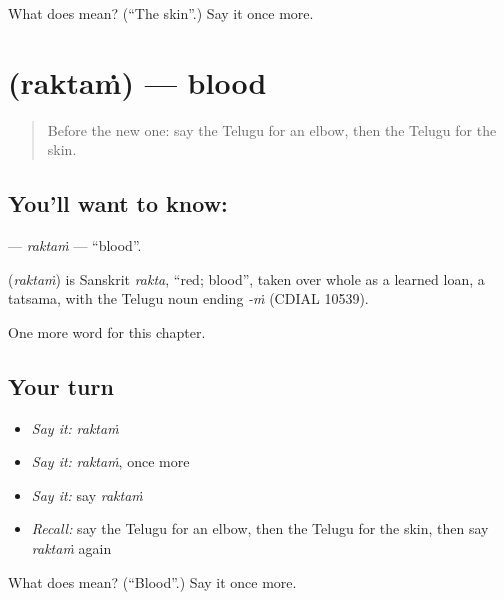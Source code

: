 \begin{tcolorbox}[breakable,colback=teal!4,colframe=teal!35!black,title={Before you move on}]
What does  mean? (\textquotedblleft{}The skin\textquotedblright{}.) Say it once more.
\end{tcolorbox}
\section[\texorpdfstring{\te{రక్తం} (raktaṁ)}{రక్తం (raktaṁ)}]{ (raktaṁ) — blood}

\label{lesson:TE-C128-raktam}



\begin{quote}
Before the new one: say the Telugu for an elbow, then the Telugu for the skin.
\end{quote}

\subsection*{You'll want to know: }
\textbf{} — \emph{raktaṁ} — \textquotedblleft{}blood\textquotedblright{}.

\begin{cousinweb}
\textbf{} (\emph{raktaṁ}) is Sanskrit \emph{rakta}, \textquotedblleft{}red; blood\textquotedblright{}, taken over whole as a learned loan, a tatsama, with the Telugu noun ending \emph{-ṁ} (CDIAL 10539).
\end{cousinweb}

\begin{grammarlens}[title={What you've built}]
One more word for this chapter.
\end{grammarlens}

\subsection*{Your turn}
\begin{itemize}
\raggedright
  \item \emph{Say it:} \emph{raktaṁ}
  \item \emph{Say it:} \emph{raktaṁ}, once more
  \item \emph{Say it:} say \emph{raktaṁ}
  \item \emph{Recall:} say the Telugu for an elbow, then the Telugu for the skin, then say \emph{raktaṁ} again
\end{itemize}

\begin{tcolorbox}[breakable,colback=teal!4,colframe=teal!35!black,title={Before you move on}]
What does  mean? (\textquotedblleft{}Blood\textquotedblright{}.) Say it once more.
\end{tcolorbox}
